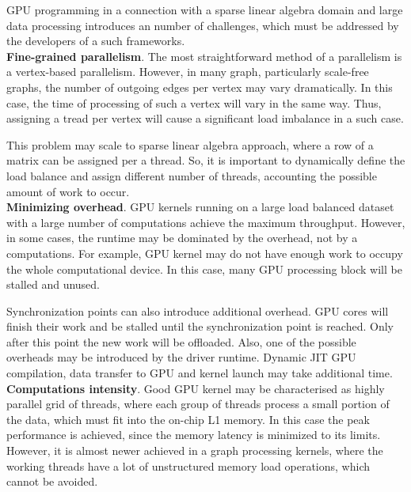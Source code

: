 GPU programming in a connection with a sparse linear algebra domain and large data processing introduces an number of challenges, which must be addressed by the developers of a such frameworks.\\

\textbf{Fine-grained parallelism}. The most straightforward method of a parallelism is a vertex-based parallelism. However, in many graph, particularly scale-free graphs, the number of outgoing edges per vertex may vary dramatically. In this case, the time of processing of such a vertex will vary in the same way. Thus, assigning a tread per vertex will cause a significant load imbalance in a such case. 

This problem may scale to sparse linear algebra approach, where a row of a matrix can be assigned per a thread. So, it is important to dynamically define the load balance and assign different number of threads, accounting the possible amount of work to occur.\\

\textbf{Minimizing overhead}. GPU kernels running on a large load balanced dataset with a large number of computations achieve the maximum throughput. However, in some cases, the runtime may be dominated by the overhead, not by a computations. For example, GPU kernel may do not have enough work to occupy the whole computational device. In this case, many GPU processing block will be stalled and unused. 

Synchronization points can also introduce additional overhead. GPU cores will finish their work and be stalled until the synchronization point is reached. Only after this point the new work will be offloaded. Also, one of the possible overheads may be introduced by the driver runtime. Dynamic JIT GPU compilation, data transfer to GPU and kernel launch may take additional time.\\

\textbf{Computations intensity}. Good GPU kernel may be characterised as highly parallel grid of threads, where each group of threads process a small portion of the data, which must fit into the on-chip L1 memory. In this case the peak performance is achieved, since the memory latency is minimized to its limits. However, it is almost newer achieved in a graph processing kernels, where the working threads have a lot of unstructured memory load operations, which cannot be avoided.\\
